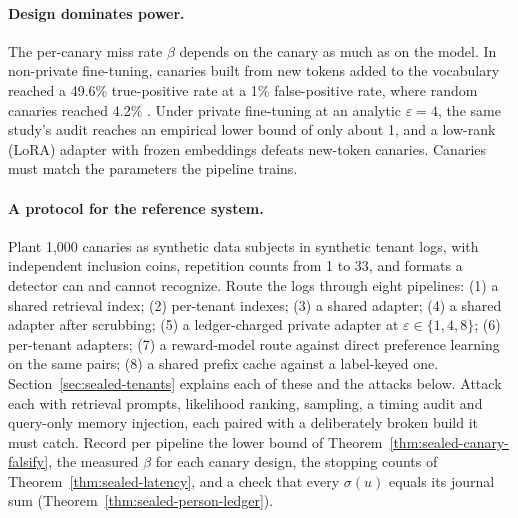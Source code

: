\paragraph{Design dominates power.}
The per-canary miss rate $\beta$ depends on the canary as much as on the
model. In non-private fine-tuning, canaries built from new tokens added to the
vocabulary reached a 49.6\% true-positive rate at a 1\% false-positive rate,
where random canaries reached 4.2\% . Under private
fine-tuning at an analytic $\varepsilon=4$, the same study's audit reaches an
empirical lower bound of only about 1, and a low-rank (LoRA) adapter with
frozen embeddings defeats new-token canaries. Canaries must match the parameters the pipeline trains.

\paragraph{A protocol for the reference system.}
Plant 1{,}000 canaries as synthetic
data subjects in synthetic tenant logs, with independent inclusion coins, repetition
counts from 1 to 33, and formats a detector can and cannot recognize. Route the
logs through eight pipelines: (1) a shared retrieval index; (2)
per-tenant indexes; (3) a shared adapter; (4) a shared adapter after
scrubbing; (5) a ledger-charged private adapter at $\varepsilon\in\{1,4,8\}$;
(6) per-tenant adapters; (7) a reward-model route against direct preference
learning on the same pairs; (8) a shared prefix cache against a label-keyed
one. Section~\ref{sec:sealed-tenants} explains each of these and the attacks
below. Attack each with retrieval prompts, likelihood ranking, sampling, a timing
audit and query-only memory injection, each paired with a deliberately broken
build it must catch. Record per pipeline the lower bound of Theorem~\ref{thm:sealed-canary-falsify}, the measured $\beta$
for each canary design, the stopping counts of
Theorem~\ref{thm:sealed-latency}, and a check that every $\sigma(u)$ equals
its journal sum (Theorem~\ref{thm:sealed-person-ledger}).

\pdexercisepointerone{\ref{ex:sealed-canary-refute}}{\pageref{ex:sealed-canary-refute}}

